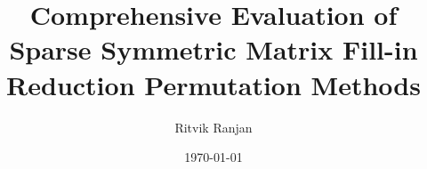 \documentclass[]{iisreport}
\title{Comprehensive Evaluation of Sparse Symmetric Matrix Fill-in Reduction Permutation Methods}
\author{Ritvik Ranjan}
\date{\today}
\begin{document}
\frontmatter





\tableofcontents

\mainmatter








\appendix

% 

\backmatter


 

\listoffigures
\listoftables
\listofalgorithms


\end{document}
